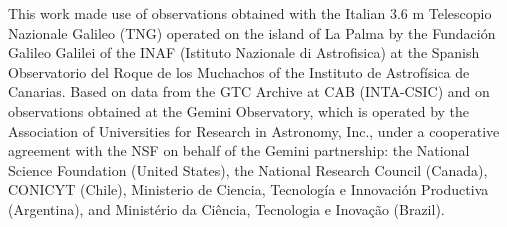 \documentclass{aa}    %
\begin{document}
\begin{acknowledgements}
%
This work made use of observations obtained with the Italian 3.6 m Telescopio Nazionale Galileo (TNG) operated on the island of La Palma by the Fundaci\'on Galileo Galilei of the INAF (Istituto Nazionale di Astrofisica) at the Spanish Observatorio del Roque de los Muchachos of the Instituto de Astrof\'isica de Canarias.
%
Based on data from the GTC Archive at CAB (INTA-CSIC) and on observations obtained at the Gemini Observatory, which is operated by the Association of Universities for Research in Astronomy, Inc., under a cooperative agreement with the NSF on behalf of the Gemini partnership: the National Science Foundation (United States), the National Research Council (Canada), CONICYT (Chile), Ministerio de Ciencia, Tecnología e Innovación Productiva (Argentina), and Ministério da Ciência, Tecnologia e Inovação (Brazil).

\end{acknowledgements}



\end{document}
